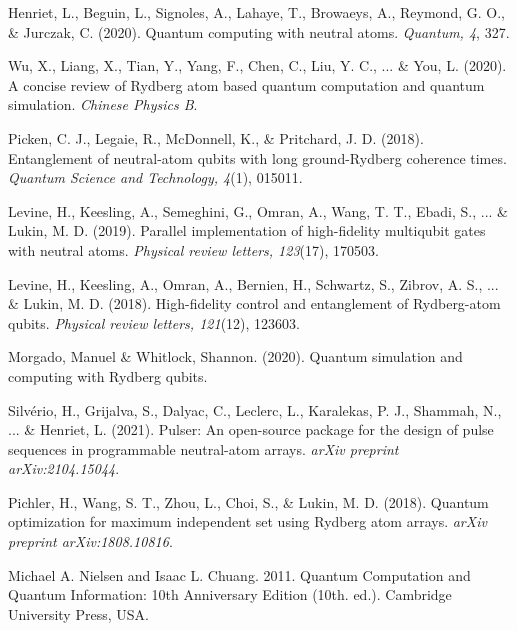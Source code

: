 \documentclass[aps,twocolumn,preprintnumbers]{revtex4}
\begin{document}
\begin{thebibliography}{5}


 Henriet, L., Beguin, L., Signoles, A., Lahaye, T., Browaeys, A., Reymond, G. O., \& Jurczak, C. (2020). Quantum computing with neutral atoms. \textit{Quantum, 4}, 327.

 Wu, X., Liang, X., Tian, Y., Yang, F., Chen, C., Liu, Y. C., ... \& You, L. (2020). A concise review of Rydberg atom based quantum computation and quantum simulation. \textit{Chinese Physics B}.

 Picken, C. J., Legaie, R., McDonnell, K., \& Pritchard, J. D. (2018). Entanglement of neutral-atom qubits with long ground-Rydberg coherence times. \textit{Quantum Science and Technology, 4}(1), 015011.

 Levine, H., Keesling, A., Semeghini, G., Omran, A., Wang, T. T., Ebadi, S., ... \& Lukin, M. D. (2019). Parallel implementation of high-fidelity multiqubit gates with neutral atoms. \textit{Physical review letters, 123}(17), 170503.

 Levine, H., Keesling, A., Omran, A., Bernien, H., Schwartz, S., Zibrov, A. S., ... \& Lukin, M. D. (2018). High-fidelity control and entanglement of Rydberg-atom qubits. \textit{Physical review letters, 121}(12), 123603.

 Morgado, Manuel \& Whitlock, Shannon. (2020). Quantum simulation and computing with Rydberg qubits. 

 Silvério, H., Grijalva, S., Dalyac, C., Leclerc, L., Karalekas, P. J., Shammah, N., ... \& Henriet, L. (2021). Pulser: An open-source package for the design of pulse sequences in programmable neutral-atom arrays. \textit{arXiv preprint arXiv:2104.15044}.

 Pichler, H., Wang, S. T., Zhou, L., Choi, S., \& Lukin, M. D. (2018). Quantum optimization for maximum independent set using Rydberg atom arrays. \textit{arXiv preprint arXiv:1808.10816}.

 Michael A. Nielsen and Isaac L. Chuang. 2011. Quantum Computation and Quantum Information: 10th Anniversary Edition (10th. ed.). Cambridge University Press, USA.


\end{thebibliography}
\end{document}
